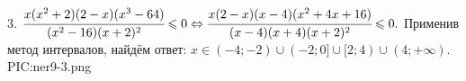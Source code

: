 3. $\cfrac{x(x^2+2)(2-x)(x^3-64)}{(x^2-16)(x+2)^2}\leqslant 0 \Leftrightarrow \cfrac{x(2-x)(x-4)(x^2+4x+16)}{(x-4)(x+4)(x+2)^2}\leqslant 0.$ Применив метод интервалов, найдём ответ: $x\in(-4;-2)\cup(-2;0]\cup[2;4)\cup(4;+\infty).$
{{PIC:ner9-3.png}}\\
